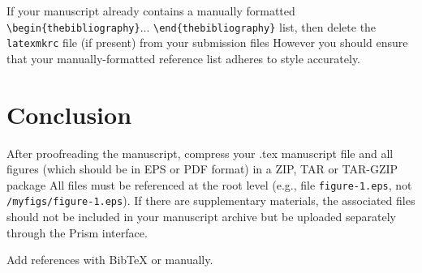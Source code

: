 \documentclass{osa-article}
\begin{document}
If your manuscript already contains a manually formatted \verb|\begin{thebibliography}|... \verb|\end{thebibliography}| list, then delete the \texttt{latexmkrc} file (if present) from your submission files
However you should ensure that your manually-formatted reference list adheres to style accurately.

\section{Conclusion}
After proofreading the manuscript, compress your .tex manuscript file and all figures (which should be in EPS or PDF format) in a ZIP, TAR or TAR-GZIP package
All files must be referenced at the root level (e.g., file \texttt{figure-1.eps}, not \texttt{/myfigs/figure-1.eps}). If there are supplementary materials, the associated files should not be included in your manuscript archive but be uploaded separately through the Prism interface.


Add references with BibTeX or manually.
\cite{Zhang:14,OSA,FORSTER2007,Dean2006,testthesis,Yelin:03,Masajada:13,codeexample}







\end{document}
